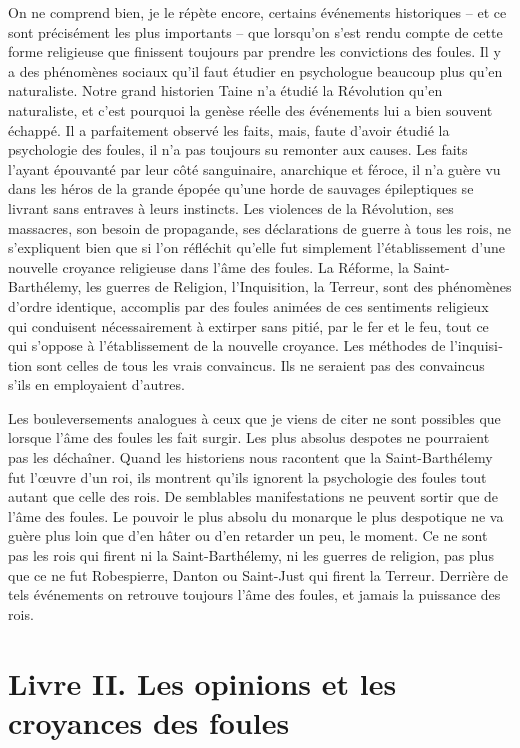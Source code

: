 \documentclass[french,twoside]{book} %
\begin{document}
On ne comprend bien, je le répète encore, certains événements historiques – et ce sont précisément les plus importants – que lorsqu’on s’est rendu compte de cette forme religieuse que finissent toujours par prendre les convictions des foules. Il y a des phénomènes sociaux qu’il faut étudier en psychologue beaucoup plus qu’en natu­raliste. Notre grand historien Taine n’a étudié la Révolution qu’en naturaliste, et c’est pourquoi la genèse réelle des événements lui a bien souvent échappé. Il a parfai­tement observé les faits, mais, faute d’avoir étudié la psychologie des foules, il n’a pas toujours su remonter aux causes. Les faits l’ayant épouvanté par leur côté sanguinaire, anarchique et féroce, il n’a guère vu dans les héros de la grande épopée qu’une horde de sauvages épileptiques se livrant sans entraves à leurs instincts. Les violences de la Révolution, ses massacres, son besoin de propagande, ses déclarations de guerre à tous les rois, ne s’expliquent bien que si l’on réfléchit qu’elle fut simplement l’établis­sement d’une nouvelle croyance religieuse dans l’âme des foules. La Réforme, la Saint-Barthélemy, les guerres de Religion, l’Inquisition, la Terreur, sont des phéno­mènes d’ordre identique, accomplis par des foules animées de ces sentiments reli­gieux qui conduisent nécessairement à extirper sans pitié, par le fer et le feu, tout ce qui s’oppose à l’établissement de la nouvelle croyance. Les méthodes de l’inquisi­tion sont celles de tous les vrais convaincus. Ils ne seraient pas des convaincus s’ils en employaient d’autres.\par
Les bouleversements analogues à ceux que je viens de citer ne sont possibles que lorsque l’âme des foules les fait surgir. Les plus absolus despotes ne pourraient pas les déchaîner. Quand les historiens nous racontent que la Saint-Barthélemy fut l’œuvre d’un roi, ils montrent qu’ils ignorent la psychologie des foules tout autant que celle des rois. De semblables manifestations ne peuvent sortir que de l’âme des foules. Le pouvoir le plus absolu du monarque le plus despotique ne va guère plus loin que d’en hâter ou d’en retarder un peu, le moment. Ce ne sont pas les rois qui firent ni la Saint-Barthélemy, ni les guerres de religion, pas plus que ce ne fut Robespierre, Danton ou Saint-Just qui firent la Terreur. Derrière de tels événements on retrouve toujours l’âme des foules, et jamais la puissance des rois.
\section[{Livre II. Les opinions et les croyances des foules}]{Livre II. Les opinions et les croyances des foules}\renewcommand{\leftmark}{Livre II. Les opinions et les croyances des foules}
\end{document}
